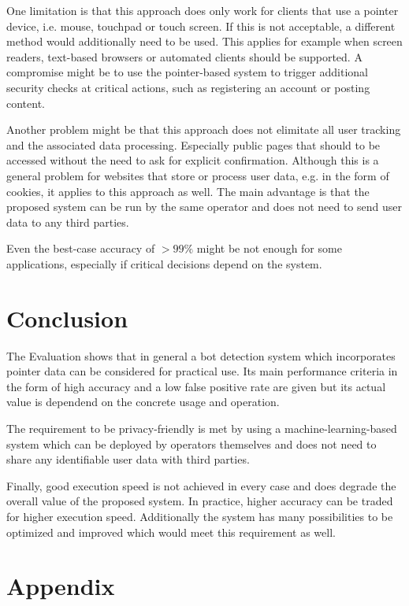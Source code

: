 \documentclass[
    fontsize=12pt,
    headings=small,
    parskip=half,           %
    bibliography=totoc,
    numbers=noenddot,       %
    open=any,               %
    final,                   %
    table
]{scrreprt}
\begin{document}
One limitation is that this approach does only work for clients that use a pointer device, i.e. mouse, touchpad or touch screen. If this is not acceptable, a different method would additionally need to be used. This applies for example when screen readers, text-based browsers or automated clients should be supported. A compromise might be to use the pointer-based system to trigger additional security checks at critical actions, such as registering an account or posting content.

Another problem might be that this approach does not elimitate all user tracking and the associated data processing. Especially public pages that should to be accessed without the need to ask for explicit confirmation. Although this is a general problem for websites that store or process user data, e.g. in the form of cookies, it applies to this approach as well. The main advantage is that the proposed system can be run by the same operator and does not need to send user data to any third parties.

Even the best-case accuracy of $>99\%$ might be not enough for some applications, especially if critical decisions depend on the system.

\chapter{Conclusion}

The Evaluation shows that in general a bot detection system which incorporates pointer data can be considered for practical use. Its main performance criteria in the form of high accuracy and a low false positive rate are given but its actual value is dependend on the concrete usage and operation.

The requirement to be privacy-friendly is met by using a machine-learning-based system which can be deployed by operators themselves and does not need to share any identifiable user data with third parties.

Finally, good execution speed is not achieved in every case and does degrade the overall value of the proposed system. In practice, higher accuracy can be traded for higher execution speed. Additionally the system has many possibilities to be optimized and improved which would meet this requirement as well.

\begin{raggedright}
  \printbibliography
\end{raggedright}

\chapter*{Appendix}
\end{document}
